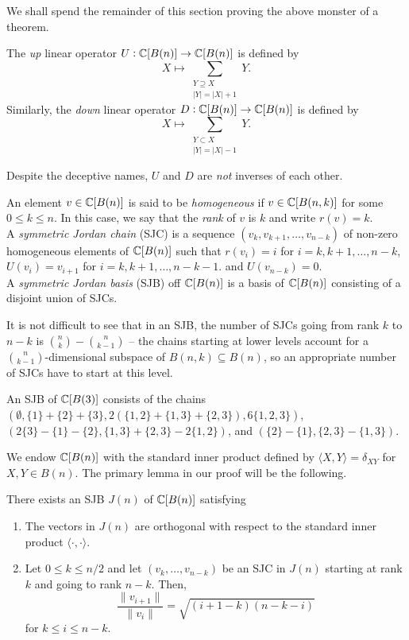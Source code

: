	We shall spend the remainder of this section proving the above monster of a theorem.

	\begin{fdef}
		The \emph{up} linear operator $U : \mathbb{C}[B(n)] \to \mathbb{C}[B(n)]$ is defined by
		\[ X \mapsto \sum_{\substack{Y \supseteq X \\ |Y|=|X|+1}} Y. \]
		Similarly, the \emph{down} linear operator $D : \mathbb{C}[B(n)] \to \mathbb{C}[B(n)]$ is defined by
		\[ X \mapsto \sum_{\substack{Y \subset X \\ |Y|=|X|-1}} Y. \]
	\end{fdef}
	
	Despite the deceptive names, $U$ and $D$ are \emph{not} inverses of each other.

	\begin{fdef}
		An element $v \in \mathbb{C}[B(n)]$ is said to be \emph{homogeneous} if $v \in \mathbb{C}[B(n,k)]$ for some $0 \le k \le n$. In this case, we say that the \emph{rank} of $v$ is $k$ and write $r(v) = k$.\\
		A \emph{symmetric Jordan chain} (SJC) is a sequence $(v_k,v_{k+1},\ldots,v_{n-k})$ of non-zero homogeneous elements of $\mathbb{C}[B(n)]$ such that $r(v_i) = i$ for $i = k,k+1,\ldots,n-k$, $U(v_i) = v_{i+1}$ for $i=k,k+1,\ldots,n-k-1$. and $U(v_{n-k}) = 0$.\\
		A \emph{symmetric Jordan basis} (SJB) off $\mathbb{C}[B(n)]$ is a basis of $\mathbb{C}[B(n)]$ consisting of a disjoint union of SJCs.
	\end{fdef}

	It is not difficult to see that in an SJB, the number of SJCs going from rank $k$ to $n-k$ is $\binom{n}{k}-\binom{n}{k-1}$ -- the chains starting at lower levels account for a $\binom{n}{k-1}$-dimensional subspace of $B(n,k) \subseteq B(n)$, so an appropriate number of SJCs have to start at this level.

	\begin{fex}
		An SJB of $\mathbb{C}[B(3)]$ consists of the chains $(\emptyset, \{1\}+\{2\}+\{3\}, 2(\{1,2\}+\{1,3\}+\{2,3\}), 6\{1,2,3\})$, $(2\{3\}-\{1\}-\{2\} , \{1,3\}+\{2,3\}-2\{1,2\})$, and $(\{2\}-\{1\} , \{2,3\} - \{1,3\})$.
	\end{fex}

	We endow $\mathbb{C}[B(n)]$ with the standard inner product defined by $\langle X,Y\rangle = \delta_{XY}$ for $X,Y \in B(n)$. The primary lemma in our proof will be the following.

	\begin{flem}
		\label{schrijver-lem}
		There exists an SJB $J(n)$ of $\mathbb{C}[B(n)]$ satisfying
		\begin{enumerate}[label=(\alph*)]
			\item The vectors in $J(n)$ are orthogonal with respect to the standard inner product $\langle \cdot,\cdot\rangle$.
			\item Let $0 \le k \le n/2$ and let $(v_k,\ldots,v_{n-k})$ be an SJC in $J(n)$ starting at rank $k$ and going to rank $n-k$. Then,
			\[ \frac{\|v_{i+1}\|}{\|v_i\|} = \sqrt{(i+1-k)(n-k-i)} \]
			for $k \le i \le n-k$.
		\end{enumerate}
	\end{flem}

